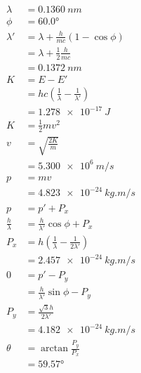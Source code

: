 \documentclass{article}
\begin{document}
\begin{align*}
  \lambda           & = \qty{0.1360}{nm}                                          \\
  \phi              & = \ang{60.0}                                                \\
  \lambda'          & = \lambda + \frac{h}{m c} (1 - \cos \phi)                   \\
                    & = \lambda + \frac{1}{2} \frac{h}{m c}                       \\
                    & = \qty{0.1372}{nm}                                          \\
  K                 & = E - E'                                                    \\
                    & = h c \left( \frac{1}{\lambda} - \frac{1}{\lambda'} \right) \\
                    & = \qty{1.278e-17}{J}                                        \\
  K                 & = \frac{1}{2} m v^2                                         \\
  v                 & = \sqrt{\frac{2 K}{m}}                                      \\
                    & = \qty{5.300e6}{m/s}                                        \\
  p                 & = m v                                                       \\
                    & = \qty{4.823e-24}{kg.m/s}                                   \\
  p                 & = p' + P_x                                                  \\
  \frac{h}{\lambda} & = \frac{h}{\lambda'} \cos \phi + P_x                        \\
  P_x               & = h \left( \frac{1}{\lambda} - \frac{1}{2 \lambda'} \right) \\
                    & = \qty{2.457e-24}{kg.m/s}                                   \\
  0                 & = p' - P_y                                                  \\
                    & = \frac{h}{\lambda'} \sin \phi - P_y                        \\
  P_y               & = \frac{\sqrt{3} h}{2 \lambda'}                             \\
                    & = \qty{4.182e-24}{kg.m/s}                                   \\
  \theta            & = \arctan \frac{P_y}{P_x}                                   \\
                    & = \ang{59.57}
\end{align*}
\end{document}
